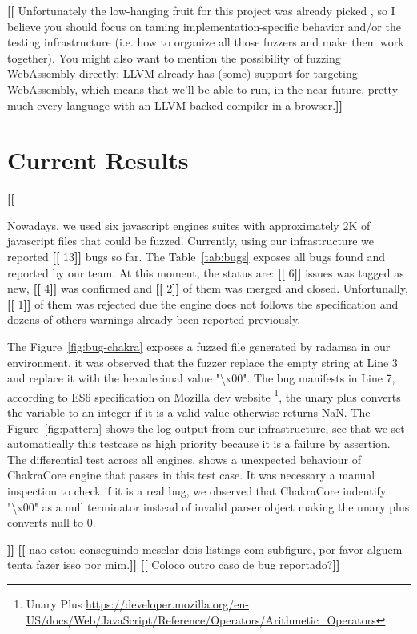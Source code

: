 \documentclass[11pt]{article}
\newcommand{\Fix}[1]{\textbf{[[}{\color{red} #1}\textbf{]]}}
\newcommand{\MAB}[1]{\textbf{[[}{\color{darkgreen} #1}\textbf{]]}}
\newcommand{\Igor}[1]{\textbf{[[}{\color{darkaquamarine} #1}\textbf{]]}}
\begin{document}
\MAB{Unfortunately the low-hanging fruit for this project was already
  picked \cite{patra2016learning}, so I believe you should focus on
  taming implementation-specific behavior and/or the testing
  infrastructure (i.e. how to organize all those fuzzers and make them
  work together). You might also want to mention the possibility of
  fuzzing
  \href{https://developer.mozilla.org/en-US/docs/WebAssembly}{WebAssembly}
  directly: LLVM already has (some) support for targeting WebAssembly,
  which means that we'll be able to run, in the near future, pretty
  much every language with an LLVM-backed compiler in a browser.}

\section{Current Results}
\label{sec:results}

\Igor{
  Nowadays, we used six javascript engines suites with approximately 2K of javascript files 
  that could be fuzzed. Currently, using our infrastructure we reported \Fix{13}
  bugs so far. The Table~\ref{tab:bugs} exposes all bugs found and reported by our team.
  At this moment, the status are: \Fix{6} issues was tagged as new, \Fix{4} was confirmed
  and \Fix{2} of them was merged and closed. Unfortunally, \Fix{1} of them was rejected
  due the engine does not follows the specification and dozens of others warnings already been
  reported previously.

  The Figure~\ref{fig:bug-chakra} exposes a fuzzed file generated by radamsa in our environment, it was observed
  that the fuzzer replace the empty string at Line 3 and replace it with the hexadecimal value "\textbackslash x00".
  The bug manifests in Line 7, according to ES6 specification on Mozilla dev website
  \footnote{Unary Plus \url{https://developer.mozilla.org/en-US/docs/Web/JavaScript/Reference/Operators/Arithmetic_Operators}},
  the unary plus converts the variable to an integer if it is a valid value
  otherwise returns NaN. The Figure~\ref{fig:pattern} shows the log output from our infrastructure,
  see that we set automatically this testcase as high priority because it is a failure by assertion.
  The differential test across all engines, shows a unexpected behaviour of ChakraCore engine that passes in this test case.
  It was necessary a manual inspection to check if it is a real bug, we observed that 
  ChakraCore indentify "\textbackslash x00" as a null terminator instead of invalid parser object making
  the unary plus converts null to 0.
}
\Fix{nao estou conseguindo mesclar dois listings com subfigure, por favor alguem tenta fazer isso por mim.}
\Igor{Coloco outro caso de bug reportado?}
\end{document}
